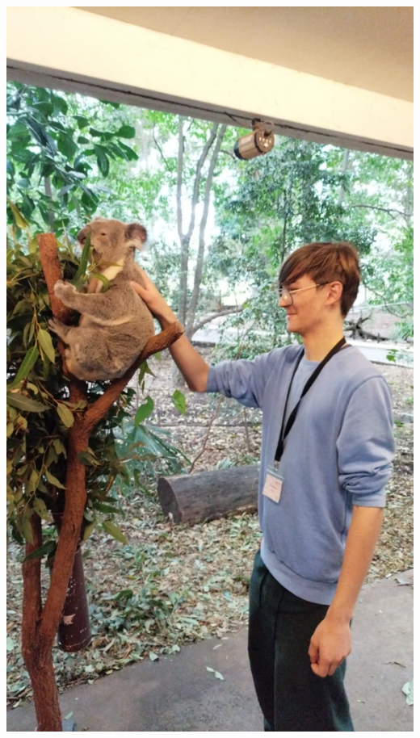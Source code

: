 \documentclass{article}
\begin{document}
\begin{center}
  \includegraphics[scale=0.13]{assets/koala.jpeg}

\end{center}
\end{document}
